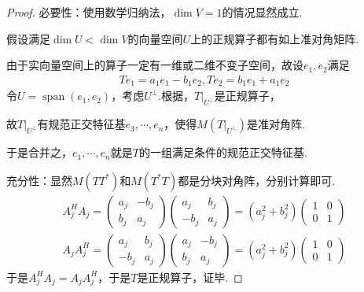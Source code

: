\begin{proof}
    必要性：使用数学归纳法，\(\dim V=1\)的情况显然成立.

    假设满足\(\dim U<\dim V\)的向量空间\(U\)上的正规算子都有如上准对角矩阵.
    
    由于实向量空间上的算子一定有一维或二维不变子空间，故设\(e_1,e_2\)满足
        \begin{align*}
            Te_1=a_1e_1-b_1e_2,Te_2=b_1e_1+a_1e_2
        \end{align*}
    令\(U=\operatorname{span}(e_1,e_2)\)，考虑\(U^\bot\).根据，\(T|_{U^\bot}\)是正规算子，
    
    故\(T|_{U^\bot}\)有规范正交特征基\(e_3,\cdots,e_n\)，使得\(M(T|_{U^\bot})\)是准对角阵.
    
    于是合并之，\(e_1,\cdots,e_n\)就是\(T\)的一组满足条件的规范正交特征基.
    
    充分性：显然\(M(TT^*)\)和\(M(T^*T)\)都是分块对角阵，分别计算即可.
    \begin{align*}
        A_j^H A_j=
        \begin{pmatrix}
            a_j & -b_j \\
            b_j & a_j
        \end{pmatrix}
        \begin{pmatrix}
            a_j  & b_j \\
            -b_j & a_j
        \end{pmatrix}
        =(a_j^2+b_j^2)
        \begin{pmatrix}
            1 & 0 \\
            0 & 1
        \end{pmatrix} \\
        A_j A_j^H=
        \begin{pmatrix}
            a_j  & b_j \\
            -b_j & a_j
        \end{pmatrix}
        \begin{pmatrix}
            a_j & -b_j \\
            b_j & a_j
        \end{pmatrix}
        =(a_j^2+b_j^2)
        \begin{pmatrix}
            1 & 0 \\
            0 & 1
        \end{pmatrix}
    \end{align*}
    于是\(A_j^H A_j=A_j A_j^H\)，于是\(T\)是正规算子，证毕.
\end{proof}

